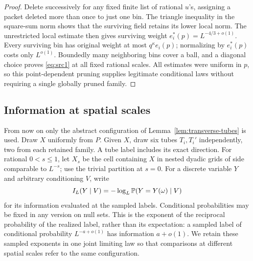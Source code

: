 \begin{proof}
Delete successively for any fixed finite list of rational $u$'s,
assigning a packet deleted more than once to just one bin.  The
triangle inequality in the square-sum norm shows that the surviving
field retains its lower local norm.  The unrestricted local estimate
then gives surviving weight $e_i^*(p)=L^{-4/3+o(1)}$.  Every surviving
bin has original weight at most $q^\kappa e_i(p)$; normalizing by
$e_i^*(p)$ costs only $L^{o(1)}$.  Boundedly many neighboring bins
cover a ball, and a diagonal choice proves \eqref{eq:src1} at all fixed
rational scales.  All estimates were uniform in $p$, so this
point-dependent pruning supplies legitimate conditional laws without
requiring a single globally pruned family.
\end{proof}

\subsection{Information at spatial scales}

From now on only the abstract configuration of
Lemma~\ref{lem:transverse-tubes} is used.  Draw $X$ uniformly from $P$.
Given $X$, draw six tubes $T_i,T_i'$ independently, two from each
retained family.  A tube label includes its exact direction.  For
rational $0<s\le1$, let $X_s$ be the cell containing $X$ in nested
dyadic grids of side comparable to $L^{-s}$; use the trivial partition
at $s=0$.  For a discrete variable $Y$ and arbitrary conditioning $V$,
write
\[
 I_L(Y\mid V)=-\log_L\mathbb P(Y=Y(\omega)\mid V)
\]
for its information evaluated at the sampled labels.  Conditional
probabilities may be fixed in any version on null sets.
This is the exponent of the reciprocal probability of the realized label,
rather than its expectation: a sampled label of conditional probability
$L^{-a+o(1)}$ has information $a+o(1)$.  We retain these sampled
exponents in one joint limiting law so that comparisons at different
spatial scales refer to the same configuration.

